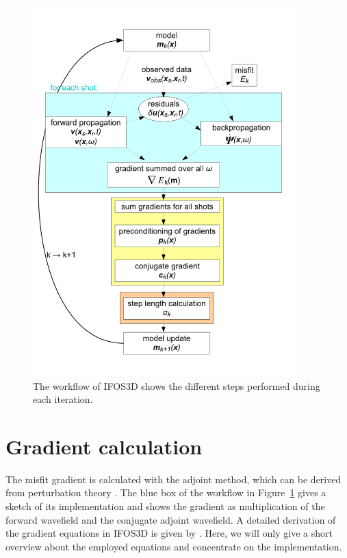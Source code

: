 \begin{figure}[h!]
\includegraphics[width=0.9\textwidth]{fig/workflow}
\caption[IFOS3D workflow]{The workflow of IFOS3D shows the different steps performed during each iteration.}\label{fig:workflow}
\end{figure}

\section{Gradient calculation}\label{sec:grad_calc}
The misfit gradient is calculated with the adjoint method, which can be derived from perturbation theory \citep[e.g.][]{Tar84, Mor87}. The blue box of the workflow in Figure~\ref{fig:workflow} gives a sketch of its implementation and shows the gradient as multiplication of the forward wavefield and the conjugate adjoint wavefield. A detailed derivation of the gradient equations in IFOS3D is given by \cite{But15}. Here, we will only give a short overview about the employed equations and concentrate on the implementation.
